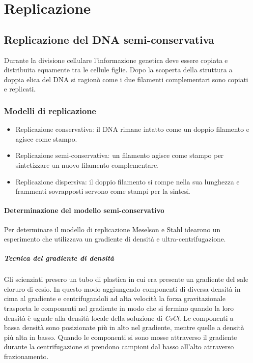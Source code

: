 \chapter{Replicazione}
\section{Replicazione del DNA semi-conservativa}
Durante la divisione cellulare l'informazione genetica deve essere copiata e distribuita equamente tra le cellule figlie. Dopo la scoperta della struttura a doppia elica del DNA
si ragion\`o come i due filamenti complementari sono copiati e replicati.
\subsection{Modelli di replicazione}
\begin{itemize}
	\item Replicazione conservativa: il DNA rimane intatto come un doppio filamento e agisce come stampo.
	\item Replicazione semi-conservativa: un filamento agisce come stampo per sintetizzare un nuovo filamento complementare.
	\item Replicazione dispersiva: il doppio filamento si rompe nella sua lunghezza e frammenti sovrapposti servono come stampi per la sintesi.
\end{itemize}
\subsubsection{Determinazione del modello semi-conservativo}
Per determinare il modello di replicazione Meselson e Stahl idearono un esperimento che utilizzava un gradiente di densit\`a e ultra-centrifugazione. 
\paragraph{Tecnica del gradiente di densit\`a}
Gli scienziati presero un tubo di plastica in cui era presente un gradiente del sale cloruro di cesio. In questo modo aggiungendo componenti di diversa densit\`a in cima al gradiente e 
centrifugandoli ad alta velocit\`a la forza gravitazionale trasporta le componenti nel gradiente in modo che si fermino quando la loro densit\`a \`e uguale alla densit\`a locale della 
soluzione di \emph{CsCl}. Le componenti a bassa densit\`a sono posizionate pi\`u in alto nel gradiente, mentre quelle a densit\`a pi\`u alta in basso. Quando le componenti si sono mosse 
attraverso il gradiente durante la centrifugazione si prendono campioni dal basso all'alto attraverso frazionamento. 
